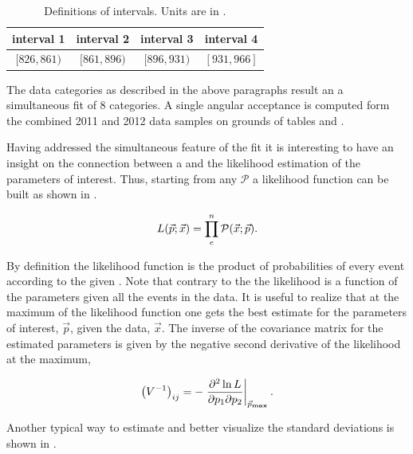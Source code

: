 \begin{table}[!h]
\centering
\begin{tabular}{c c c c}
  \hline
  interval 1 & interval 2 & interval 3 & interval 4\\
  \hline
  $ [826,861) $ & $ [861,896) $ & $ [896,931) $ & $ [931,966] $ \\
  \hline
\end{tabular}
\caption{Definitions of \mkpi intervals. Units are in \mevcc.}
\label{Kbindef}
\end{table}

The data categories as described in the above paragraphs result an a simultaneous fit of 8 categories.
A single angular acceptance is computed form the combined 2011 and 2012 data samples on grounds of
tables  and .

Having addressed the simultaneous feature of the fit it is interesting to have an insight on
the connection between a \pdf and the likelihood estimation of the parameters of interest. Thus, starting from
any \pdf $\mathcal{P}$ a likelihood function can be built as shown in .

\begin{equation}
  \centering
L(\vec{p};\vec{x}) = \prod_e^n \mathcal{P}(\vec{x};\vec{p}).
\label{likelihood}
\end{equation}

\noindent By definition the likelihood
function is the product of probabilities of every event according to the given \pdf. Note that contrary to the \pdf
the likelihood is a function of the parameters given all the events in the data. It is
useful to realize that at the maximum of the likelihood function one gets the best estimate for the parameters of
interest, $\vec{p}$, given the data, $\vec{x}$. The inverse of the covariance matrix for the estimated parameters is given
by the negative second derivative of the likelihood at the maximum,

\begin{equation}
  \centering
\left( V^{-1} \right)_{ij} = - \left. \frac{\partial^2\ln L}{\partial p_1 \partial p_2} \right|_{ \vec{p}_{\rm\bf max}}.
\label{covariance}
\end{equation}

\noindent Another typical way to estimate and better visualize the standard deviations is shown in .


